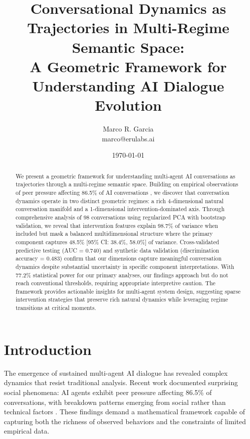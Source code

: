 \documentclass[11pt,letterpaper]{article}
\title{Conversational Dynamics as Trajectories in Multi-Regime Semantic Space: \\
\large A Geometric Framework for Understanding AI Dialogue Evolution}
\author{
Marco R. Garcia \\
marco@erulabs.ai
}
\date{\today}
\newcommand{\totalConversations}{98}
\newcommand{\powerOutcomeGroups}{77.2\%}
\newcommand{\allFeaturesPCOne}{98.7\%}  %
\newcommand{\nonInterventionPCOneVariance}{48.5\%}  %
\newcommand{\nonInterventionPCOneCILower}{38.4\%}
\newcommand{\nonInterventionPCOneCIUpper}{58.0\%}
\newcommand{\testAUC}{0.740}
\newcommand{\syntheticDiscriminationAccuracy}{0.483}
\newcommand{\fullReasoningPeerPressure}{86.5\%}
\begin{document}
\maketitle

\begin{abstract}
We present a geometric framework for understanding multi-agent AI conversations as trajectories through a multi-regime semantic space. Building on empirical observations of peer pressure affecting \fullReasoningPeerPressure{} of AI conversations \citep{garcia2025peer}, we discover that conversation dynamics operate in two distinct geometric regimes: a rich 4-dimensional natural conversation manifold and a 1-dimensional intervention-dominated axis. Through comprehensive analysis of \totalConversations{} conversations using regularized PCA with bootstrap validation, we reveal that intervention features explain \allFeaturesPCOne{} of variance when included but mask a balanced multidimensional structure where the primary component captures \nonInterventionPCOneVariance{} [95\% CI: \nonInterventionPCOneCILower{}, \nonInterventionPCOneCIUpper{}] of variance. Cross-validated predictive testing (AUC = \testAUC{}) and synthetic data validation (discrimination accuracy = \syntheticDiscriminationAccuracy{}) confirm that our dimensions capture meaningful conversation dynamics despite substantial uncertainty in specific component interpretations. With \powerOutcomeGroups{} statistical power for our primary analyses, our findings approach but do not reach conventional thresholds, requiring appropriate interpretive caution. The framework provides actionable insights for multi-agent system design, suggesting sparse intervention strategies that preserve rich natural dynamics while leveraging regime transitions at critical moments.
\end{abstract}

\section{Introduction}

The emergence of sustained multi-agent AI dialogue has revealed complex dynamics that resist traditional analysis. Recent work documented surprising social phenomena: AI agents exhibit peer pressure affecting \fullReasoningPeerPressure{} of conversations, with breakdown patterns emerging from social rather than technical factors \citep{garcia2025peer}. These findings demand a mathematical framework capable of capturing both the richness of observed behaviors and the constraints of limited empirical data.
\end{document}
